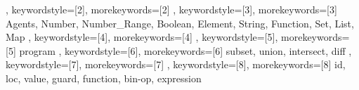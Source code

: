 {{	 }, 
	 keywordstyle=[2]{\asmlstrule}, %
	 morekeywords=[2]{
	 }, 
	 keywordstyle=[3]{\asmlstdomain}, %
	 morekeywords=[3]{
	 	Agents, Number, Number_Range, Boolean, Element, String, Function, Set, List, Map
	 },
	 keywordstyle=[4]{\asmlstpredicate},%
	 morekeywords=[4]{
	 },
	 keywordstyle=[5]{\asmlstfunction}, %
	 morekeywords=[5]{
		program
	 },
	 keywordstyle=[6]{\asmlstderived}, %
	 morekeywords=[6]{
	 subset, union, intersect, diff
	 },
	 keywordstyle=[7]{\asmlstvariable}, %
	 morekeywords=[7]{
	 },
	 keywordstyle=[8]{\asmlstconstant}, %
	 morekeywords=[8]{
	 id, loc, value, guard, function, bin-op, expression
	 }
}
\newcommand{\AsmKeyword}[1]{\lstset{morekeywords=[1]{#1}}}
\newcommand{\AsmRule}[1]{\lstset{morekeywords=[2]{#1}}}
\newcommand{\AsmDomain}[1]{\lstset{morekeywords=[3]{#1}}}
\newcommand{\AsmPredicate}[1]{\lstset{morekeywords=[4]{#1}}}
\newcommand{\AsmFunction}[1]{\lstset{morekeywords=[5]{#1}}}
\newcommand{\AsmDerivedFunction}[1]{\lstset{morekeywords=[6]{#1}}}
\newcommand{\AsmVariable}[1]{\lstset{morekeywords=[7]{#1}}}
\newcommand{\AsmConstantOrEnum}[1]{\lstset{morekeywords=[8]{#1}}}

\newcommand{\asmboxed}[1]{\fontsize{7}{8.4}\ensuremath{\boxed{\hspace{-.175em}#1\hspace{-.175em}}}}